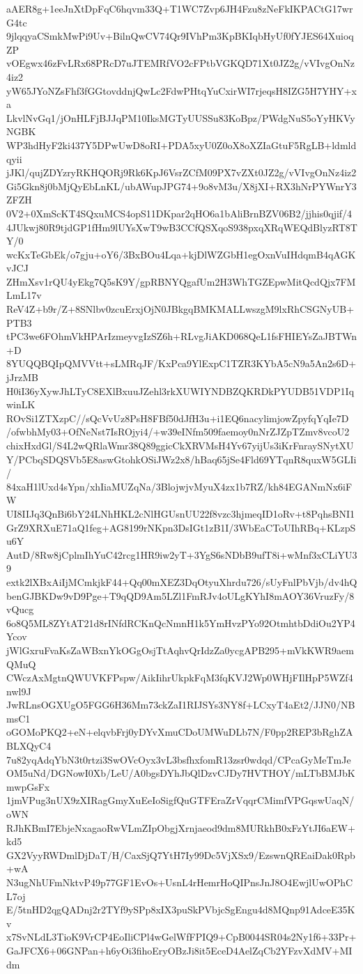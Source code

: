 aAER8g+1eeJnXtDpFqC6hqvm33Q+T1WC7Zvp6JH4Fzu8zNeFkIKPACtG17wrG4tc
9jlqqyaCSmkMwPi9Uv+BilnQwCV74Qr9IVhPm3KpBKIqbHyUf0fYJES64XuioqZP
vOEgwx46zFvLRx68PRcD7uJTEMRfVO2cFPtbVGKQD71Xt0JZ2g/vVIvgOnNz4iz2
yW65JYoNZsFhf3fGGtovddnjQwLc2FdwPHtqYuCxirWI7rjeqsH8IZG5H7YHY+xa
LkvlNvGq1/jOnHLFjBJJqPM10IksMGTyUUSSu83KoBpz/PWdgNuS5oYyHKVyNGBK
WP3hdHyF2ki437Y5DPwUwD8oRI+PDA5xyU0Z0oX8oXZIaGtuF5RgLB+ldmldqyii
jJKl/qujZDYzryRKHQORj9Rk6KpJ6VsrZCfM09PX7vZXt0JZ2g/vVIvgOnNz4iz2
Gi5Gkn8j0bMjQyEbLnKL/ubAWupJPG74+9o8vM3u/X8jXI+RX3hNrPYWnrY3ZFZH
0V2+0XmScKT4SQxuMCS4opS11DKpar2qHO6a1bAliBrnBZV06B2/jjhis0qjif/4
4JUkwj80R9tjdGP1fHm9lUYsXwT9wB3CCfQSXqoS938pxqXRqWEQdBlyzRT8TY/0
wcKxTeGbEk/o7gju+oY6/3BxBOu4Lqa+kjDlWZGbH1egOxnVuIHdqmB4qAGKvJCJ
ZHmXsv1rQU4yEkg7Q5sK9Y/gpRBNYQgafUm2H3WhTGZEpwMitQcdQjx7FMLmL17v
ReV4Z+b9r/Z+8SNlbv0zcuErxjOjN0JBkgqBMKMALLwszgM9lxRhCSGNyUB+PTB3
tPC3we6FOhmVkHPArIzmeyvgIzSZ6h+RLvgJiAKD068QeL1fsFHIEYsZaJBTWn+D
8YUQQBQIpQMVVtt+sLMRqJF/KxPca9YlExpC1TZR3KYbA5cN9a5An2s6D+jJrzMB
H0iI36yXywJhLTyC8EXlBxuuJZehl3rkXUWIYNDBZQKRDkPYUDB51VDP1IqwinLK
ROvSi1ZTXzpC//sQcVvUz8PsH8FBf50dJfH3u+i1EQ6nacylimjowZpyfqYqIe7D
/ofwbhMy03+OfNeNst7IsROjyi4/+w39eINfm509faemoy0nNrZJZpTZmv8vcoU2
chixHxdGl/S4L2wQRlaWmr38Q89ggicCkXRVMsH4Yv67yijUs3iKrFnraySNytXU
Y/PCbqSDQSVb5E8aswGtohkOSiJWz2x8/hBaq65jSe4Fld69YTqnR8quxW5GLIi/
84xaH1lUxd4sYpn/xhIiaMUZqNa/3BlojwjvMyuX4zx1b7RZ/kh84EGANmNx6iFW
UI8IIJq3QnBi6bY24LNhHKL2cNlHGUsnUU22f8vzc3hjmeqID1oRv+t8PqhsBNI1
GrZ9XRXuE71aQ1feg+AG8199rNKpn3DsIGt1zB1I/3WbEaCToUIhRBq+KLzpSu6Y
AutD/8Rw8jCplmIhYuC42rcg1HR9iw2yT+3YgS6sNDbB9ufT8i+wMnf3xCLiYU39
extk2lXBxAiIjMCmkjkF44+Qq00mXEZ3DqOtyuXhrdu726/sUyFnlPbVjb/dv4hQ
benGJBKDw9vD9Pge+T9qQD9Am5LZl1FmRJv4oULgKYhI8mAOY36VruzFy/8vQucg
6o8Q5ML8ZYtAT21d8rINfdRCKnQcNmnH1k5YmHvzPYo92OtmhtbDdiOu2YP4Ycov
jWlGxruFvaKsZaWBxnYkOGgOsjTtAqhvQrIdzZa0ycgAPB295+mVkKWR9aemQMuQ
CWczAxMgtnQWUVKFPspw/AikIihrUkpkFqM3fqKVJ2Wp0WHjFIlHpP5WZf4nwl9J
JwRLnsOGXUgO5FGG6H36Mm73ckZaI1RIJSYs3NY8f+LCxyT4aEt2/JJN0/NBmsC1
oGOMoPKQ2+eN+elqvbFrj0yDYvXmuCDoUMWuDLb7N/F0pp2REP3bRghZABLXQyC4
7u82yqAdqYbN3t0rtzi3SwOVcOyx3vL3bsfhxfomR13zsr0wdqd/CPcaGyMeTmJe
OM5uNd/DGNowI0Xb/LeU/A0bgsDYhJbQlDzvCJDy7HVTHOY/mLTbBMJbKmwpGsFx
1jmVPug3nUX9zXIRagGmyXuEeIoSigfQuGTFEraZrVqqrCMimfVPGqswUaqN/oWN
RJhKBmI7EbjeNxagaoRwVLmZIpObgjXrnjaeod9dm8MURkhB0xFzYtJI6aEW+kd5
GX2VyyRWDmlDjDaT/H/CaxSjQ7YtH7Iy99Dc5VjXSx9/EzswnQREaiDak0Rpb+wA
N3ugNhUFmNktvP49p77GF1EvOs+UsnL4rHemrHoQIPnsJnJ8O4EwjlUwOPhCL7oj
E/5tnHD2qgQADnj2r2TYf9ySPp8xIX3puSkPVbjcSgEngu4d8MQnp91AdceE35Kv
x7SvNLdL3TioK9VrCP4EoIliCPl4wGelWfFPIQ9+CpB0044SR04s2Ny1f6+33Pr+
GaJFCX6+06GNPan+h6yOi3fihoEryOBzJi8it5EceD4AelZqCb2YFzvXdMV+MIdm
